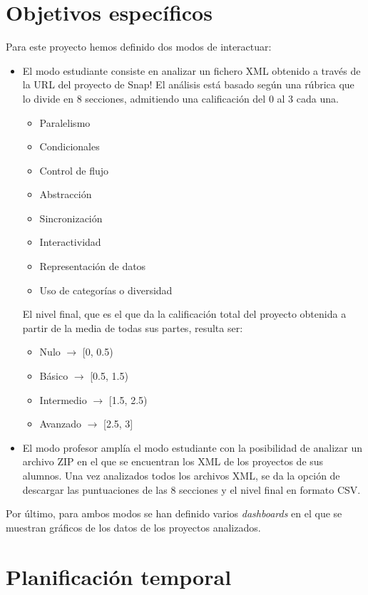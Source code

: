 \documentclass[a4paper, 12pt]{book}
\begin{document}
\section{Objetivos específicos}
\label{sec:objetivos-especificos}

Para este proyecto hemos definido dos modos de interactuar:
\begin{itemize}
\item 
El modo estudiante consiste en analizar un fichero XML obtenido a través de la URL del proyecto de Snap! El análisis está basado según una rúbrica que lo divide en 8 secciones, admitiendo una calificación del 0 al 3 cada una.
\begin{itemize}
      \item
     Paralelismo
      \item
     Condicionales
      \item
      Control de flujo
      \item
      Abstracción
      \item
      Sincronización
      \item
      Interactividad
      \item
      Representación de datos
      \item
      Uso de categorías o diversidad
    \end{itemize}
El nivel final, que es el que da la calificación total del proyecto obtenida a partir de la media de todas sus partes, resulta ser:
    \begin{itemize}
          \item
          Nulo $\rightarrow $ [0, 0.5)
          \item
          Básico $\rightarrow $ [0.5, 1.5)
          \item
          Intermedio $\rightarrow $ [1.5, 2.5)
          \item
          Avanzado $\rightarrow $ [2.5, 3]
     \end{itemize}
\item
El modo profesor amplía el modo estudiante con la posibilidad de analizar un archivo ZIP en el que se encuentran los XML de los proyectos de sus alumnos. Una vez analizados todos los archivos XML, se da la opción de descargar las puntuaciones  de las 8 secciones y el nivel final en formato CSV.

\end{itemize}
Por último, para ambos modos se han definido varios \emph{dashboards} en el que se muestran gráficos de los datos de los proyectos analizados.
\section{Planificación temporal}
\label{sec:planificacion-temporal}
\end{document}
